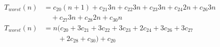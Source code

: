 \begin{subequations}
\label{eq:findlinesegments-4}
\begin{align}
\label{eq:findlinesegments-4-1}
T_{worst}(n)& = 
c_{20}(n+1)
+ c_{21}3n
+ c_{22}3n
+ c_{23}3n
+ c_{24}2n
+ c_{26}3n
\\
& \quad
+ c_{27}3n
+ c_{28}2n
+ c_{30}n
\nonumber \\
\label{eq:findlinesegments-4-2}
T_{worst}(n)& = 
n(c_{20} + 3c_{21} + 3c_{22} + 3c_{23} + 2c_{24} + 3c_{26} + 3c_{27}
\\
& \quad \quad
+ 2c_{28} + c_{30}) + c_{20}
\nonumber%
\end{align}
\end{subequations}
